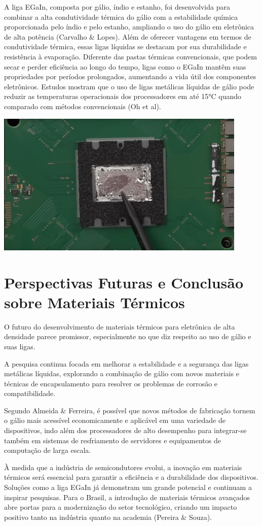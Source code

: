 \documentclass[12pt]{article}
\begin{document}
A liga EGaIn, composta por gálio, índio e estanho, foi desenvolvida para combinar a alta condutividade térmica do gálio com a estabilidade química proporcionada pelo índio e pelo estanho, ampliando o uso do gálio em eletrônica de alta potência (Carvalho \& Lopes).
Além de oferecer vantagens em termos de condutividade térmica, essas ligas líquidas se destacam por sua durabilidade e resistência à evaporação. Diferente das pastas térmicas convencionais, que podem secar e perder eficiência ao longo do tempo, ligas como o EGaIn mantêm suas propriedades por períodos prolongados, aumentando a vida útil dos componentes eletrônicos. Estudos mostram que o uso de ligas metálicas líquidas de gálio pode reduzir as temperaturas operacionais dos processadores em até 15°C quando comparado com métodos convencionais (Oh et al).
\begin{adjustbox}{center,caption={Chip que utiliza metal liquido como interface termica},nofloat=figure,vspace=\bigskipamount}
    \centering
    \includegraphics[width=12cm]{chip.png}
\end{adjustbox}
\section{Perspectivas Futuras e Conclusão sobre Materiais Térmicos}
O futuro do desenvolvimento de materiais térmicos para eletrônica de alta densidade parece promissor, especialmente no que diz respeito ao uso de gálio e suas ligas. 

A pesquisa continua focada em melhorar a estabilidade e a segurança das ligas metálicas líquidas, explorando a combinação de gálio com novos materiais e técnicas de encapsulamento para resolver os problemas de corrosão e compatibilidade. 

Segundo Almeida \& Ferreira, é possível que novos métodos de fabricação tornem o gálio mais acessível economicamente e aplicável em uma variedade de dispositivos, indo além dos processadores de alto desempenho para integrar-se também em sistemas de resfriamento de servidores e equipamentos de computação de larga escala.

À medida que a indústria de semicondutores evolui, a inovação em materiais térmicos será essencial para garantir a eficiência e a durabilidade dos dispositivos. Soluções como a liga EGaIn já demonstram um grande potencial e continuam a inspirar pesquisas. Para o Brasil, a introdução de materiais térmicos avançados abre portas para a modernização do setor tecnológico, criando um impacto positivo tanto na indústria quanto na academia (Pereira \& Souza).
\newpage
\printbibliography
\end{document}
